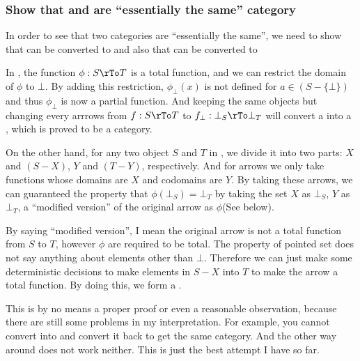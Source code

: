 \documentclass[11pt]{article}
\begin{document}
{%
\newcommand{\setbot}{}
\subsubsection{Show that \setbot and 
are ``essentially the same'' category}

In order to see that two categories are ``essentially the same'',
we need to show that \setbot can be converted to 
and also that  can be converted to \setbot

In \setbot, the function $\phi : S \rTo T$ is a total function,
and we can restrict the domain of $\phi$ to ${\bot}$.
By adding this restriction, $\phi_\bot(x)$ is not defined for $a \in (S - \{\bot\})$
and thus $\phi_\bot$ is now a partial function. And keeping the same objects but
changing every arrrows from $f : S \rTo T$ to $f_\bot : \bot_S \rTo \bot_T$
will convert a \setbot into a , which is proved to be a category.

On the other hand, for any two object $S$ and $T$ in , we divide it into two parts:
$X$ and $(S - X)$, $Y$ and $(T - Y)$, respectively.
And for arrows we only take functions whose domains are $X$ and codomains are $Y$.
By taking these arrows, we can guaranteed the property that $\phi(\bot_S) = \bot_T$
by taking the set $X$ as $\bot_S$, $Y$ as $\bot_T$, a ``modified version'' of
the original arrow as $\phi$(See below).

By saying ``modified version'', I mean the original arrow is not a total function
from $S$ to $T$, however $\phi$ are required to be total. The property of pointed
set does not say anything about elements other than $\bot$. Therefore we can just
make some deterministic decisions to make elements in $S - X$ into $T$ to make
the arrow a total function. By doing this, we form a \setbot.

This is by no means a proper proof or even a reasonable observation,
because there are still some problems in my interpretation. For example,
you cannot convert  into \setbot and convert it back to get the same category.
And the other way around does not work neither. This is just the best attempt I have so far.
}%
\end{document}
